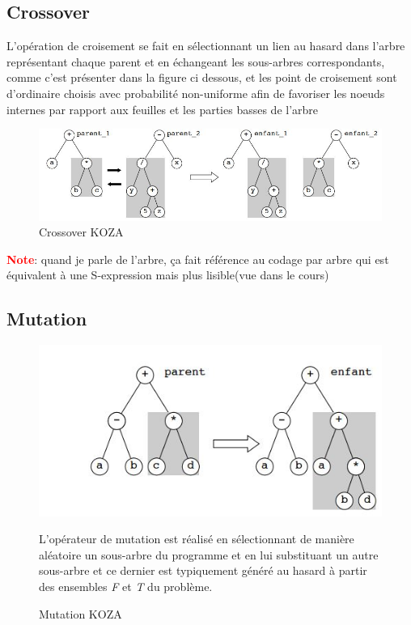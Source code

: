 \subsection{Crossover}
 L'opération de croisement se fait en sélectionnant un lien au
hasard dans l'arbre représentant chaque parent et en
échangeant les sous-arbres correspondants, comme c'est présenter dans la figure ci dessous, 
et les point de croisement sont d'ordinaire choisis avec probabilité non-uniforme afin de 
favoriser les noeuds
internes par rapport aux feuilles et les parties basses de l'arbre
\begin{figure}[H]
\centering

\includegraphics[width=\linewidth]{../figures/codagearbrea.JPG}
\caption{Crossover KOZA}
\label{fig:Crossoverkoza}
\end{figure}
\textbf{\textcolor{red}{Note}}: quand je parle de l'arbre, ça fait référence au codage 
par arbre qui est équivalent à une S-expression mais plus lisible(vue dans le cours)

\subsection{Mutation}
\begin{figure}[H]
\centering
\includegraphics[width=\linewidth]{../figures/codagearbreb.JPG}
\caption{Mutation KOZA}
\label{fig:Mutationkoza}
L’opérateur de mutation est réalisé en sélectionnant de
manière aléatoire un sous-arbre du programme et en lui
substituant un autre sous-arbre et ce dernier est typiquement généré au hasard à partir
des ensembles \textit{F} et \textit{T} du problème.
\end{figure}
